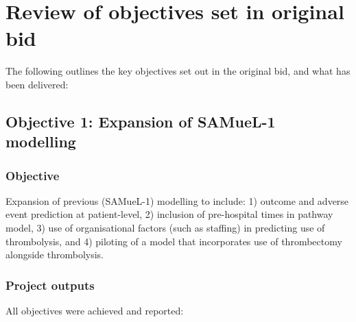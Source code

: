 \section{Review of objectives set in original bid}
\label{sec:objectives_met}

The following outlines the key objectives set out in the original bid, and what has been delivered:

\subsection{Objective 1: Expansion of SAMueL-1 modelling}

\subsubsection{Objective}

Expansion of previous (SAMueL-1) modelling to include: 1) outcome and adverse event prediction at patient-level, 2) inclusion of pre-hospital times in pathway model, 3) use of organisational factors (such as staffing) in predicting use of thrombolysis, and 4) piloting of a model that incorporates use of thrombectomy alongside thrombolysis.

\subsubsection{Project outputs}

All objectives were achieved and reported:

